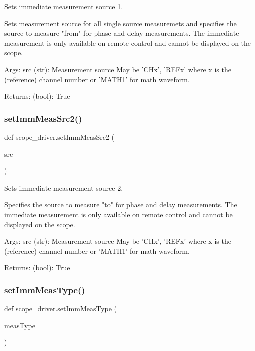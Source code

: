 \begin{DoxyVerb}Sets immediate measurement source 1.

Sets measurement source for all single source measuremets and
specifies the source to measure "from" for phase and delay
measurements. The immediate measurement is only available
on remote control and cannot be displayed on the scope.

Args:
    src (str): Measurement source
        May be 'CHx', 'REFx' where x is the (reference) channel
        number or 'MATH1' for math waveform.

Returns:
    (bool): True
\end{DoxyVerb}
 \mbox{\label{namespacescope__driver_a0a2ecb52f63eb59614b12be61ff7b664}} 
\subsubsection{\texorpdfstring{set\+Imm\+Meas\+Src2()}{setImmMeasSrc2()}}
{\footnotesize\ttfamily def scope\+\_\+driver.\+set\+Imm\+Meas\+Src2 (\begin{DoxyParamCaption}\item[{}]{src }\end{DoxyParamCaption})}

\begin{DoxyVerb}Sets immediate measurement source 2.

Specifies the source to measure "to" for phase and delay
measurements. The immediate measurement is only available
on remote control and cannot be displayed on the scope.

Args:
    src (str): Measurement source
        May be 'CHx', 'REFx' where x is the (reference) channel
        number or 'MATH1' for math waveform.

Returns:
    (bool): True
\end{DoxyVerb}
 \mbox{\label{namespacescope__driver_ae38317e7891b58c37b45b1fd30840a50}} 
\subsubsection{\texorpdfstring{set\+Imm\+Meas\+Type()}{setImmMeasType()}}
{\footnotesize\ttfamily def scope\+\_\+driver.\+set\+Imm\+Meas\+Type (\begin{DoxyParamCaption}\item[{}]{meas\+Type }\end{DoxyParamCaption})}

